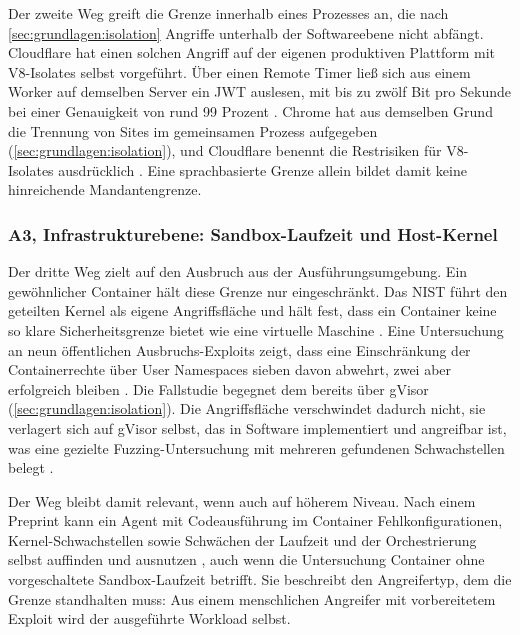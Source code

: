 Der zweite Weg greift die Grenze innerhalb eines Prozesses an, die nach \autoref{sec:grundlagen:isolation} Angriffe
unterhalb der Softwareebene nicht abfängt. Cloudflare hat einen solchen Angriff auf der eigenen produktiven Plattform
mit V8-Isolates selbst vorgeführt. Über einen Remote Timer ließ sich aus einem Worker auf demselben Server ein
\ac{JWT} auslesen, mit bis zu zwölf Bit pro Sekunde bei einer Genauigkeit
von rund 99 Prozent \autocites[S.~1]{schwarzl_remote-timer-as--service_2026}{schwarzl_revisit_2026}. Chrome hat aus
demselben Grund die Trennung von Sites im gemeinsamen Prozess aufgegeben
(\autoref{sec:grundlagen:isolation}), und Cloudflare benennt die Restrisiken für V8-Isolates ausdrücklich
\autocite{cloudflare_security_2026}. Eine sprachbasierte Grenze allein bildet damit keine hinreichende
Mandantengrenze.

\subsubsection{A3, Infrastrukturebene: Sandbox-Laufzeit und Host-Kernel}

Der dritte Weg zielt auf den Ausbruch aus der Ausführungsumgebung. Ein gewöhnlicher Container
hält diese Grenze nur eingeschränkt. Das \ac{NIST} führt den geteilten Kernel als eigene
Angriffsfläche und hält fest, dass ein Container keine so klare Sicherheitsgrenze bietet wie eine virtuelle Maschine \autocite[S.~7, 18]{souppaya_application_2017}. Eine Untersuchung an neun öffentlichen Ausbruchs-Exploits
zeigt, dass eine Einschränkung der Containerrechte über User Namespaces sieben davon abwehrt,
zwei aber erfolgreich bleiben \autocite[S.~44]{reeves_towards_2021}. Die Fallstudie begegnet dem bereits
über gVisor (\autoref{sec:grundlagen:isolation}). Die Angriffsfläche verschwindet dadurch nicht,
sie verlagert sich auf gVisor selbst, das in Software implementiert und angreifbar ist, was eine gezielte Fuzzing-Untersuchung mit mehreren gefundenen Schwachstellen belegt \autocite[S.~168]{li_g-fuzz_2024}.

Der Weg bleibt damit relevant, wenn auch auf höherem Niveau. Nach einem Preprint kann ein Agent mit Codeausführung im Container
Fehlkonfigurationen, Kernel-Schwachstellen sowie Schwächen der Laufzeit und der Orchestrierung selbst auffinden und
ausnutzen \autocite[S.~1]{marchand_quantifying_2026}, auch wenn die Untersuchung Container ohne vorgeschaltete
Sandbox-Laufzeit betrifft. Sie beschreibt den Angreifertyp, dem die Grenze standhalten muss: Aus einem menschlichen
Angreifer mit vorbereitetem Exploit wird der ausgeführte Workload selbst.

